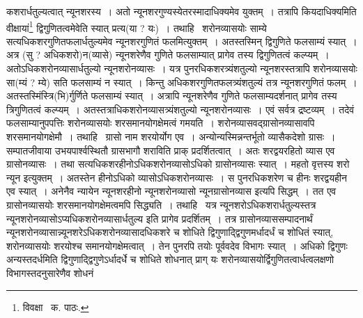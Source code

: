 \documentclass[11pt, openany]{book}
\begin{document}
\noindent कशरार्धतुल्यत्वात् न्यूनशरस्य~। अतो न्यूनशरगुण्यस्येतरस्मादाधिक्यमेव युक्तम्~। तत्रापि कियदाधिक्यमिति वीक्षायां\renewcommand{\thefootnote}{१}\footnote{विवक्षा \textendash\ क. पाठः.} द्विगुणितत्वमेवेति स्यात् प्रत्य(या ? यः)~। तथाहि \textendash\ शरोनव्यासयोः साम्ये सत्यधिकशरगुणितफलार्धतुल्यमेव न्यूनशरगुणितं फलमित्युक्तम्~। अतस्तस्मिन् द्विगुणिते फलसाम्यं स्यात्~। अत्र (सु ? अधिकशरो)न(व्यासे) न्यूनशरेणैव गुणिते फलसाम्यात् प्रागेव तस्य द्विगुणितत्वं कल्प्यम्~। अतोऽधिकशरोनव्यासार्धतुल्यो न्यूनशरोनव्यासः~। यत्र पुनरधिकशरत्र्यंशतुल्यो न्यूनशरस्तत्रापि शरोनव्यासयोः सा(म्यं ? म्ये) सति फलसाम्यं न स्यात्~। किन्तु अधिकशरगुणितफलत्र्यंशतुल्यं तत्र न्यूनशरगुणितं फलम्~। अतस्तस्मिंस्त्रि(भि)र्गुर्णिते फलसाम्यं स्यात्~। अत्रापि न्यूनशरेणैव गुणिते फलसाम्यदर्शनात् प्रागेव तस्य त्रिगुणितत्वं कल्प्यम्~। अतस्तत्राधिकशरोनव्यासत्र्यंशतुल्यो न्यूनशरोनव्यासः~। एवं सर्वत्र द्रष्टव्यम्~। तदेवं फलसाम्यानुपपत्तिः शरोनव्यासयोः शरसमानयोगक्षेमत्वं गमयति~। शरोनव्यासवद्ग्रासोनव्यासावपि शरसमानयोगक्षेमौ~। तथाहि \textendash\ ग्रासो नाम शरयोर्योग एव~। अन्योन्यस्मिन्नन्तर्भूतो व्यासैकदेशो ग्रासः~। सम्पातजीवाया उभयपार्श्वस्थितौ ग्रासभागौ शराविति प्राक् प्रदर्शितत्वात्~। अतः शरद्वयरहितो व्यास एव ग्रासोनव्यासः~। तथा सत्यधिकशरहीनोऽधिकशरोनव्यासोऽधिको ग्रासोनव्यासः स्यात्~। महतो वृत्तस्य शरो न्यून इत्युक्तम्~। अतस्तेन हीनोऽधिको व्यासोऽधिकशरोनव्यासः~। स पुनरधिकशरेण च हीनः शरद्वयहीन एव स्यात्~। अनेनैव न्यायेन न्यूनशरहीनो न्यूनशरोनव्यासो न्यूनग्रासोनव्यास इत्यपि सिद्धम्~। तत एव ग्रासोनव्यासयोः शरसमानयोगक्षेमत्वमपि सिद्ध्यति~। तथाहि \textendash\ यत्र न्यूनशरोऽधिकशरार्धतुल्यस्तत्र न्यूनशरोनव्यासोऽप्यधिकशरोनव्यासार्धतुल्य इति प्रागेव प्रदर्शितम्~। तत्र ग्रासोनव्याससम्पादनार्थं न्यूनशरोनव्यासान्न्यूनशरेऽधिकशरोनव्यासादधिकशरे च शोधिते द्विगुणाद्द्विगुणमर्धादर्धं च शोधितं स्यात्, शरोनव्यासयोः शरयोश्च समानयोगक्षेमत्वात्~। तेन पुनरपि तयोः पूर्ववदेव विभागः स्यात्~। अधिको द्विगुणः अन्यस्तदर्धमिति द्विगुणाद्द्विगुणेऽर्धादर्धे च शोधिते शोधनात् प्राग् यः शरोनव्यासयोर्द्विगुणितत्वार्धत्वलक्षणो विभागस्तदनुसारेणैव शोधनं

\newpage
\end{document}
